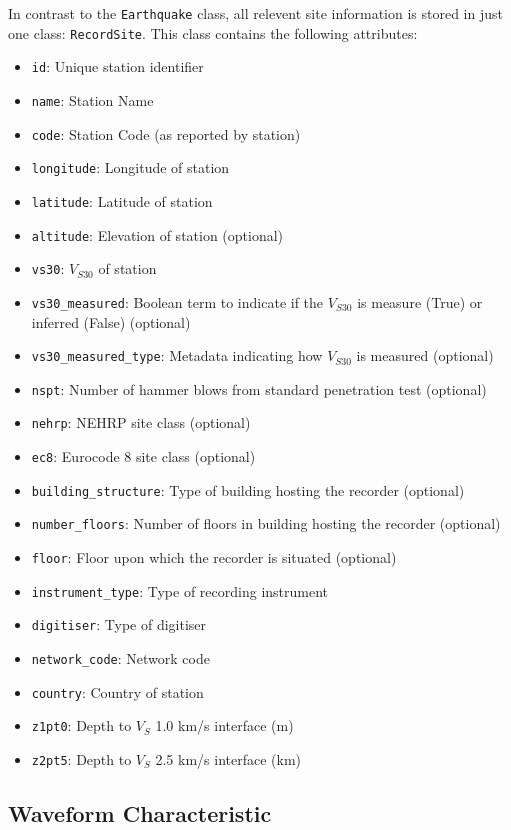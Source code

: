In contrast to the \verb=Earthquake= class, all relevent site information is stored in just one class: \verb=RecordSite=. This class contains the following attributes:
\begin{itemize}
\item \verb=id=: Unique station identifier
\item \verb=name=: Station Name
\item \verb=code=: Station Code (as reported by station)
\item \verb=longitude=: Longitude of station
\item \verb=latitude=: Latitude of station
\item \verb=altitude=: Elevation of station (optional)
\item \verb=vs30=: $V_{S30}$ of station
\item \verb=vs30_measured=: Boolean term to indicate if the $V_{S30}$ is measure (True) or inferred (False) (optional)
\item \verb=vs30_measured_type=: Metadata indicating how $V_{S30}$ is measured (optional)
\item \verb=nspt=: Number of hammer blows from standard penetration test (optional)
\item \verb=nehrp=: NEHRP site class (optional)
\item \verb=ec8=: Eurocode 8 site class (optional)
\item \verb=building_structure=: Type of building hosting the recorder (optional)
\item \verb=number_floors=: Number of floors in building hosting the recorder (optional)
\item \verb=floor=: Floor upon which the recorder is situated (optional)
\item \verb=instrument_type=: Type of recording instrument
\item \verb=digitiser=: Type of digitiser
\item \verb=network_code=: Network code
\item \verb=country=: Country of station
\item \verb=z1pt0=: Depth to $V_S$ 1.0 km/s interface (m)
\item \verb=z2pt5=: Depth to $V_S$ 2.5 km/s interface (km)
\end{itemize}

\subsection{Waveform Characteristic}

